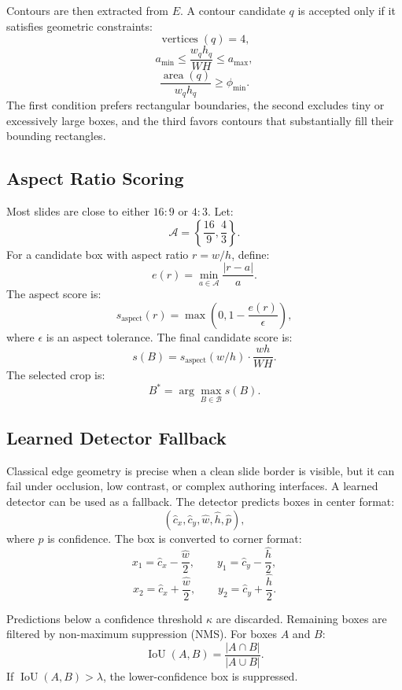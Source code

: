 \documentclass[11pt]{article}
\begin{document}
Contours are then extracted from $E$. A contour candidate $q$ is accepted only if it satisfies geometric constraints:
\[
\operatorname{vertices}(q)=4,
\]
\[
a_{\min} \le \frac{w_qh_q}{WH} \le a_{\max},
\]
\[
\frac{\operatorname{area}(q)}{w_qh_q} \ge \phi_{\min}.
\]
The first condition prefers rectangular boundaries, the second excludes tiny or excessively large boxes, and the third favors contours that substantially fill their bounding rectangles.

\subsection{Aspect Ratio Scoring}

Most slides are close to either $16:9$ or $4:3$. Let:
\[
\mathcal{A}=\left\{\frac{16}{9},\frac{4}{3}\right\}.
\]
For a candidate box with aspect ratio $r=w/h$, define:
\[
e(r)=\min_{a\in\mathcal{A}}\frac{|r-a|}{a}.
\]
The aspect score is:
\[
s_{\text{aspect}}(r)
=
\max\left(0,1-\frac{e(r)}{\epsilon}\right),
\]
where $\epsilon$ is an aspect tolerance. The final candidate score is:
\[
s(B)=s_{\text{aspect}}(w/h)\cdot\frac{wh}{WH}.
\]
The selected crop is:
\[
B^*=\arg\max_{B\in\mathcal{B}}s(B).
\]

\subsection{Learned Detector Fallback}

Classical edge geometry is precise when a clean slide border is visible, but it can fail under occlusion, low contrast, or complex authoring interfaces. A learned detector can be used as a fallback. The detector predicts boxes in center format:
\[
(\hat{c}_x,\hat{c}_y,\hat{w},\hat{h},\hat{p}),
\]
where $\hat{p}$ is confidence. The box is converted to corner format:
\[
x_1=\hat{c}_x-\frac{\hat{w}}{2}, \qquad
y_1=\hat{c}_y-\frac{\hat{h}}{2},
\]
\[
x_2=\hat{c}_x+\frac{\hat{w}}{2}, \qquad
y_2=\hat{c}_y+\frac{\hat{h}}{2}.
\]

Predictions below a confidence threshold $\kappa$ are discarded. Remaining boxes are filtered by non-maximum suppression (NMS). For boxes $A$ and $B$:
\[
\operatorname{IoU}(A,B)
=
\frac{|A\cap B|}{|A\cup B|}.
\]
If $\operatorname{IoU}(A,B)>\lambda$, the lower-confidence box is suppressed.
\end{document}
